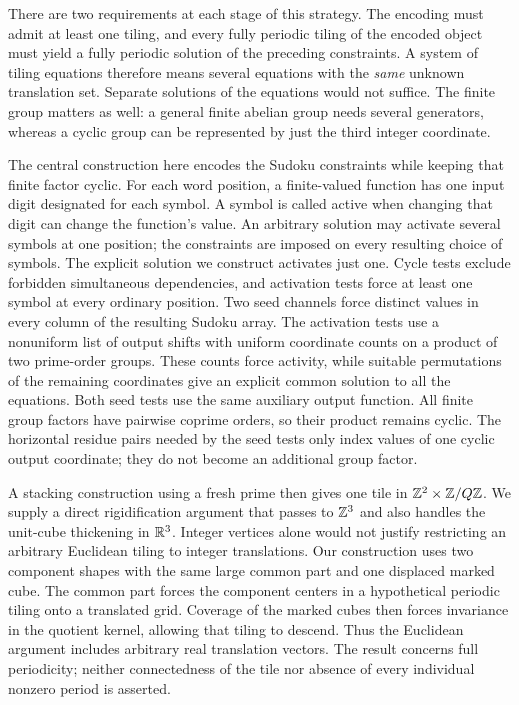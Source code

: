 There are two requirements at each stage of this strategy. The encoding
must admit at least one tiling, and every fully periodic tiling of the
encoded object must yield a fully periodic solution of the preceding
constraints. A system of tiling equations therefore means several
equations with the \emph{same} unknown translation set. Separate
solutions of the equations would not suffice. The finite group matters
as well: a general finite abelian group needs several generators, whereas
a cyclic group can be represented by just the third integer coordinate.

The central construction here encodes the Sudoku constraints while
keeping that finite factor cyclic. For each word position, a finite-valued
function has one input digit designated for each symbol. A symbol is
called active when changing that digit can change the function's value.
An arbitrary solution may activate several symbols at one position;
the constraints are imposed on every resulting choice of symbols.
The explicit solution we construct activates just one.
Cycle tests exclude forbidden simultaneous dependencies, and activation
tests force at least one symbol at every ordinary position.  Two seed
channels force distinct values in every column of the resulting Sudoku
array.  The activation tests use a nonuniform list of output shifts with
uniform coordinate counts on a product of two prime-order groups.
These counts force activity, while suitable permutations of the
remaining coordinates give an explicit common solution to all the
equations. Both seed tests use the same auxiliary output function.  All finite group factors have pairwise coprime
orders, so their product remains cyclic. The horizontal residue pairs
needed by the seed tests only index values of one cyclic output
coordinate; they do not become an additional group factor.

A stacking construction using a fresh prime then gives one tile in
$\mathbb Z^2\times\mathbb Z/Q\mathbb Z$.  We supply a direct rigidification argument that
passes to $\mathbb Z^3$ and also handles the unit-cube thickening in $\mathbb R^3$.
Integer vertices alone would not justify restricting an arbitrary
Euclidean tiling to integer translations. Our construction uses two
component shapes with the same large common part and one displaced
marked cube. The common part forces the component centers in a
hypothetical periodic tiling onto a translated grid. Coverage of the
marked cubes then forces invariance in the quotient kernel, allowing
that tiling to descend.  Thus the Euclidean argument includes arbitrary real
translation vectors.  The result concerns full periodicity; neither
connectedness of the tile nor absence of every individual nonzero
period is asserted.

